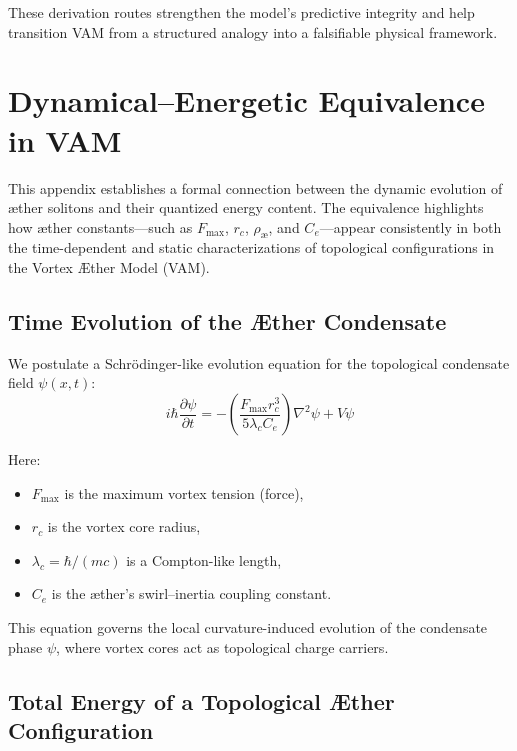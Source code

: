         These derivation routes strengthen the model’s predictive integrity and help transition VAM from a structured analogy into a falsifiable physical framework.


\section{Dynamical–Energetic Equivalence in VAM}

            This appendix establishes a formal connection between the dynamic evolution of æther solitons and their quantized energy content. The equivalence highlights how æther constants—such as $F_{\max}$, $r_c$, $\rho_{\text{æ}}$, and $C_e$—appear consistently in both the time-dependent and static characterizations of topological configurations in the Vortex Æther Model (VAM).

            \subsection{Time Evolution of the Æther Condensate}

            We postulate a Schrödinger-like evolution equation for the topological condensate field $\psi(x,t)$:
            \begin{equation}
            i\hbar \frac{\partial \psi}{\partial t} = - \left( \frac{F_{\max} r_c^3}{5 \lambda_c C_e} \right) \nabla^2 \psi + V \psi
            \end{equation}

            Here:
            \begin{itemize}
              \item $F_{\max}$ is the maximum vortex tension (force),
              \item $r_c$ is the vortex core radius,
              \item $\lambda_c = \hbar / (m c)$ is a Compton-like length,
              \item $C_e$ is the æther’s swirl–inertia coupling constant.
            \end{itemize}

            This equation governs the local curvature-induced evolution of the condensate phase $\psi$, where vortex cores act as topological charge carriers.

            \subsection{Total Energy of a Topological Æther Configuration}

